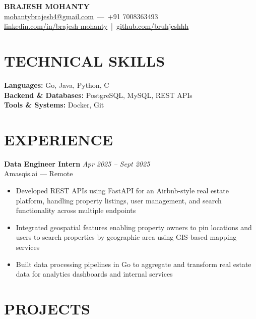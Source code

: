 \documentclass[a4paper,11pt]{article}
\begin{document}
\begin{center}
{\LARGE \textbf{BRAJESH MOHANTY}} \\[6pt]
\href{mailto:mohantybrajesh4@gmail.com}{mohantybrajesh4@gmail.com} \,---\, +91 7008363493 \\[4pt]
\href{https://linkedin.com/in/brajesh-mohanty}{linkedin.com/in/brajesh-mohanty} \,|\, 
\href{https://github.com/bruhjeshhh}{github.com/bruhjeshhh}
\end{center}

\vspace{6pt}

\section*{TECHNICAL SKILLS}
\textbf{Languages:} Go, Java, Python, C\\
\textbf{Backend \& Databases:} PostgreSQL, MySQL, REST APIs \\
\textbf{Tools \& Systems:} Docker, Git \\


\section*{EXPERIENCE}
\textbf{Data Engineer Intern} \hfill \textit{Apr 2025 – Sept 2025} \\
Amasqis.ai — Remote
\begin{itemize}[leftmargin=1em]
    \item Developed REST APIs using FastAPI for an Airbnb-style real estate platform, handling property listings, user management, and search functionality across multiple endpoints
    \item Integrated geospatial features enabling property owners to pin locations and users to search properties by geographic area using GIS-based mapping services
    \item Built data processing pipelines in Go to aggregate and transform real estate data for analytics dashboards and internal services
    
\end{itemize}
\section*{PROJECTS}
\end{document}
